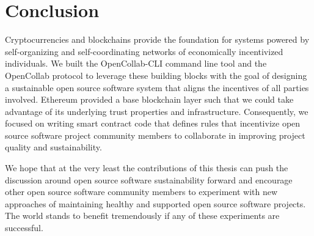 \section{Conclusion}

Cryptocurrencies and blockchains provide the foundation for systems powered by
self-organizing and self-coordinating networks of economically incentivized
individuals. We built the OpenCollab-CLI command line tool and the OpenCollab
protocol to leverage these building blocks with the goal of designing a
sustainable open source software system that aligns the incentives of all
parties involved. Ethereum provided a base blockchain layer such that we could take advantage of
its underlying trust properties and infrastructure. Consequently, we focused on
writing smart contract code that defines rules that incentivize open source
software project community members to collaborate in improving project quality
and sustainability.

We hope that at the very least the contributions of this thesis can push the
discussion around open source software sustainability forward and encourage
other open source software community members to experiment with new
approaches of maintaining healthy and supported open source software projects. The
world stands to benefit tremendously if any of these experiments are successful.